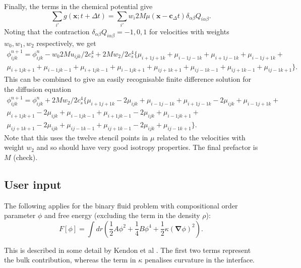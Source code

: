 Finally, the terms in the chemical potential give
\begin{equation}
\sum_{i'} g(\mathbf{x};t + \Delta t) =
\sum_{i'} w_i 2M\mu(\mathbf{x} - \mathbf{c}_ \Delta t)
\delta_{\alpha\beta} Q_{i\alpha\beta}.
\end{equation}
Noting that the contraction $\delta_{\alpha\beta} Q_{i\alpha\beta} =
-1, 0, 1$ for velocities with weights $w_0, w_1, w_2$ respectively,
we get
\begin{eqnarray}
\phi_{ijk}^{n+1} = \phi_{ijk}^n -  w_0 2M u_{ijk}/2c_s^4
+ 2M w_2/2c_s^4 \Big\{
\mu_{i+1 j+1 k} + \mu_{i-1 j-1 k} + \mu_{i+1 j-1 k} + \mu_{i-1 j+1 k} + \\
\mu_{i+1 j k+1} + \mu_{i-1 j k-1} + \mu_{i+1 j k-1} + \mu_{i-1 j k+1} +
\mu_{i j+1 k+1} + \mu_{i j-1 k-1} + \mu_{i j+1 k-1} + \mu_{i j-1 k+1} \Big\}.
\end{eqnarray}
This can be combined to give an easily recognisable finite difference
solution for the diffusion equation
\begin{eqnarray}
\phi_{ijk}^{n+1} = \phi_{ijk}^n + 2M w_2 / 2 c_s^4
\Big\{
\mu_{i+1 j+1 k} - 2\mu_{ijk} + \mu_{i-1 j-1 k} + 
\mu_{i+1 j-1 k} - 2\mu_{ijk} + \mu_{i-1 j+1 k} + \\
\mu_{i+1 j k+1} - 2\mu_{ijk} + \mu_{i-1 j k-1} +
\mu_{i+1 j k-1} - 2\mu_{ijk} + \mu_{i-1 j k+1} + \\
\mu_{i j+1 k+1} - 2\mu_{ijk} + \mu_{i j-1 k-1} + 
\mu_{i j+1 k-1} - 2\mu_{ijk} + \mu_{i j-1 k+1} \Big\}.
\end{eqnarray}
Note that this uses the twelve stencil points in $\mu$ related to
the velocities with weight $w_2$ and so should have very good isotropy
properties. The final prefactor is $M$ (check).

\subsection{User input}


The following applies for the binary fluid problem with
compositional order parameter $\phi$ and free energy
(excluding the term in the density $\rho$):
\begin{equation}
 F[\phi] = 
\int dr \left(
{\textstyle \frac{1}{2}}A\phi^2
+ {\textstyle \frac{1}{4}}B\phi^4
+ {\textstyle \frac{1}{2}}\kappa (\mathbf{\nabla}\phi)^2 \right).
\end{equation}

This is described in some detail
by Kendon et al \cite{viv}. The first two terms represent the bulk
contribution, whereas the term in $\kappa$ penalises curvature in
the interface.

